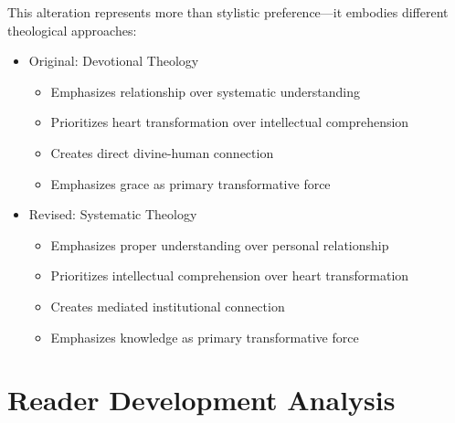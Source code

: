 \documentclass[11pt,twoside]{book}
\begin{document}
This alteration represents more than stylistic preference—it embodies different theological approaches:
\begin{itemize}
\item Original: Devotional Theology
\label{sec:org21472f8}
\begin{itemize}
\item Emphasizes relationship over systematic understanding
\item Prioritizes heart transformation over intellectual comprehension
\item Creates direct divine-human connection
\item Emphasizes grace as primary transformative force
\end{itemize}
\item Revised: Systematic Theology
\label{sec:org7df5ad4}
\begin{itemize}
\item Emphasizes proper understanding over personal relationship
\item Prioritizes intellectual comprehension over heart transformation
\item Creates mediated institutional connection
\item Emphasizes knowledge as primary transformative force
\end{itemize}
\end{itemize}
\section*{Reader Development Analysis}
\label{sec:org2be732b}
\end{document}

